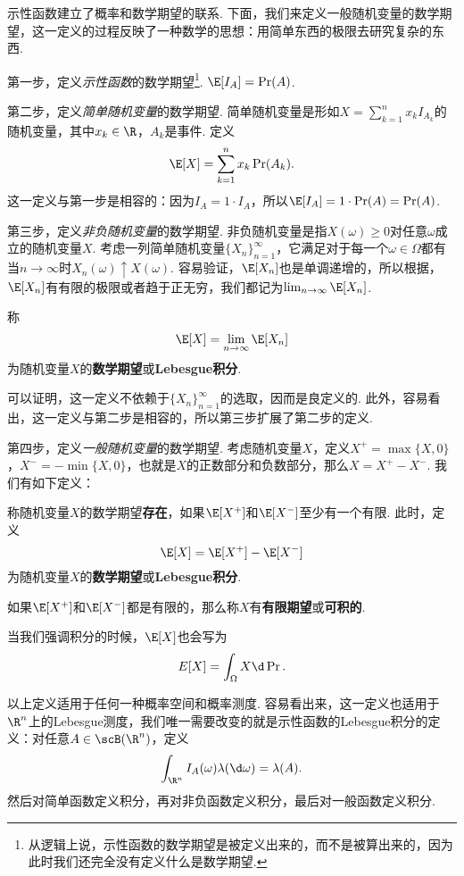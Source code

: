 示性函数建立了概率和数学期望的联系. 下面，我们来定义一般随机变量的数学期望，这一定义的过程反映了一种数学的思想：用简单东西的极限去研究复杂的东西. 

第一步，定义\emph{示性函数}的数学期望\footnote{从逻辑上说，示性函数的数学期望是被定义出来的，而不是被算出来的，因为此时我们还完全没有定义什么是数学期望. }. $\E[I_A]=\Pr(A)$.

第二步，定义\emph{简单随机变量}的数学期望. 简单随机变量是形如$X=\sum_{k=1}^n x_kI_{A_k}$的随机变量，其中$x_k\in\R$，$A_k$是事件. 定义
\[\E[X]=\sum_{k=1}^n x_k\Pr(A_k).\]
这一定义与第一步是相容的：因为$I_A=1\cdot I_{A}$，所以$\E[I_A]=1\cdot\Pr(A)=\Pr(A)$. 

第三步，定义\emph{非负随机变量}的数学期望. 非负随机变量是指$X(\omega)\geq 0$对任意$\omega$成立的随机变量$X$. 考虑一列简单随机变量$\{X_n\}_{n=1}^\infty$，它满足对于每一个$\omega\in\Omega$都有当$n\to\infty$时$X_n(\omega)\uparrow X(\omega)$. 容易验证，$\E[X_n]$也是单调递增的，所以根据，$\E[X_n]$有有限的极限或者趋于正无穷，我们都记为$\lim_{n\to\infty} \E[X_n]$.

\begin{definition}
称
\[\E[X]=\lim_{n\to\infty}\E[X_n]\]
为随机变量$X$的\textbf{数学期望}或\textbf{Lebesgue积分}. 
\end{definition}

可以证明，这一定义不依赖于$\{X_n\}_{n=1}^\infty$的选取，因而是良定义的. 此外，容易看出，这一定义与第二步是相容的，所以第三步扩展了第二步的定义. 

第四步，定义\emph{一般随机变量}的数学期望. 考虑随机变量$X$，定义$X^+=\max\{X,0\}$，$X^-=-\min\{X,0\}$，也就是$X$的正数部分和负数部分，那么$X=X^+-X^-$. 我们有如下定义：

\begin{definition}
称随机变量$X$的数学期望\textbf{存在}，如果$\E[X^+]$和$\E[X^-]$至少有一个有限. 此时，定义
\[\E[X]=\E[X^+]-\E[X^-]\]
为随机变量$X$的\textbf{数学期望}或\textbf{Lebesgue积分}. 

如果$\E[X^+]$和$\E[X^-]$都是有限的，那么称$X$有\textbf{有限期望}或\textbf{可积的}. 
\end{definition}

当我们强调积分的时候，$\E[X]$也会写为
\[E[X]=\int_\Omega X\d\Pr.\]

以上定义适用于任何一种概率空间和概率测度. 容易看出来，这一定义也适用于$\R^n$上的Lebesgue测度，我们唯一需要改变的就是示性函数的Lebesgue积分的定义：对任意$A\in\scB(\R^n)$，定义
\[\int_{\R^n} I_A(\omega)\lambda(\d \omega)=\lambda(A).\]
然后对简单函数定义积分，再对非负函数定义积分，最后对一般函数定义积分. 

